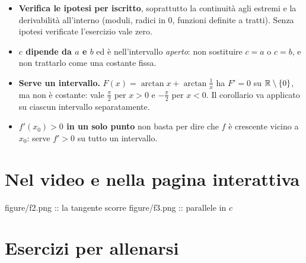 \documentclass[10pt]{article}
\begin{document}
\begin{attenzione}
\begin{itemize}
  \item \textbf{Verifica le ipotesi per iscritto}, soprattutto la continuità agli estremi e la derivabilità all'interno
        (moduli, radici in $0$, funzioni definite a tratti). Senza ipotesi verificate l'esercizio vale zero.
  \item \textbf{$c$ dipende da $a$ e $b$} ed è nell'intervallo \emph{aperto}: non sostituire $c = a$ o $c = b$, e non trattarlo come una costante fissa.
  \item \textbf{Serve un intervallo.} $F(x) = \arctan x + \arctan\frac1x$ ha $F' = 0$ su $\mathbb{R}\setminus\{0\}$, ma non è costante:
        vale $\frac{\pi}{2}$ per $x > 0$ e $-\frac{\pi}{2}$ per $x < 0$. Il corollario va applicato su ciascun intervallo separatamente.
  \item \textbf{$f'(x_0) > 0$ in un solo punto} non basta per dire che $f$ è crescente vicino a $x_0$: serve $f' > 0$ su tutto un intervallo.
\end{itemize}
\end{attenzione}

\section{Nel video e nella pagina interattiva}

\begin{nelvideo}
\end{nelvideo}

  {figure/f2.png :: la tangente scorre}
  {figure/f3.png :: parallele in $c$}


\section{Esercizi per allenarsi}
\end{document}
